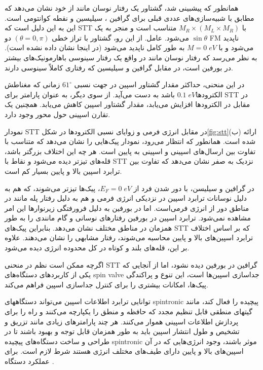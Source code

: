همانطور که پیشبینی شد، گشتاور یک رفتار نوسان مانند از خود نشان ‌می‌دهد که مطابق با شبیه‌سازی‌های عددی قبلی برای گرافین \cite{maherSpindependentTransportSpin2022}، \cite{phamElectronicMagneticProperties2020}سیلیسین \cite{cheraghchiEdgeStatesTheir2012} و نقطه کوانتو‌‌می‌‌ است. این به این دلیل است که \gls{STT} با $M_R \times (M_L \times M_R)$ متناسب است و منجر به یک $\sin\theta$ ‌می‌شود. عامل. از این رو، گشتاور با تراز خطی $(\theta = 0, \pi)$ دو \gls{FM} ناپدید ‌‌می‌‌شود و با $M = 0\; eV$ به طور کامل ناپدید ‌‌می‌‌شود (در اینجا نشان داده نشده است). به نظر ‌‌می‌‌رسد که رفتار نوسان مانند در واقع یک رفتار سینوسی با‌هارمونیک‌های بیشتر در ‌بورفین است، در مقابل گرافین و سیلیسین که رفتاری کاملاً سینوسی دارند. 

در این منحنی، حداکثر مقدار گشتاور اسپین در جهت نسبی $61^\circ$ زمانی که مغناطش الکترودها$0.1\;eV$ باشد به دست ‌‌می‌‌آید. از سوی دیگر، به عنوان پارامتر برای \gls{STT} در مقابل در الکترودها افزایش ‌‌می‌‌یابد، مقدار گشتاور اسپین کاهش ‌‌می‌‌یابد. همچنین یک تقارن اسپینی حول محور وجود دارد. 

نمودار \gls{STT} در مقابل انرژی فر‌‌می‌‌ و زوایای نسبی الکترودها در شکل\ref{fig:stt}(ب) ارائه شده است. همانطور که انتظار ‌‌می‌‌رود، نمودار پیک‌هایی را نشان ‌‌می‌‌دهد که متناسب با تفاوت بین ارسال‌های اسپینی و اسپینی به پایین است. هر چه این اختلاف بزرگتر باشد، قله‌های تیزتر دیده ‌‌می‌‌شود و نقاط با \gls{STT} نزدیک به صفر نشان ‌‌می‌‌دهد که تفاوت بین ترابرد اسپین بالا و پایین بسیار کم است. 

در گرافین و سیلیسن، با دور شدن فرد از $E_F = 0\; eV$، پیک‌ها تیزتر ‌می‌‌شوند، که هم به دلیل نوسانات ترابرد اسپین در نزدیکی انرژی فر‌‌می‌‌ و هم به دلیل رفتار پله مانند در مناطق دور از انرژی فر‌‌می‌‌است. اما در ‌بورفین به دلیل فرورفتگی زیر‌نوارها این امر مشاهده نمی‌‌شود. ترابرد اسپین در ‌بورفین رفتارهای نوسانی و گام مانندی را به طور همزمان در مناطق مختلف نشان ‌‌می‌‌دهد. بنابراین پیک‌های \gls{STT} که بر اساس اختلاف ترابرد اسپین‌های بالا و پایین محاسبه ‌می‌شوند، رفتار مشابهی را نشان ‌می‌دهند. علاوه بر این، قله‌های بلند و کوتاه در کل محدوده انرژی دیده ‌‌می‌‌شود. 

اگرچه ممکن است نظم در منحنی \gls{STT} گرافین در ‌بورفین دیده نشود، اما از آنجایی که یکی از کاربردهای دستگاه‌های \gls{spin valve} جداسازی اسپین‌ها است، این تنوع و پراکندگی پیک‌ها، امکانات بیشتری را برای کنترل جداسازی اسپین فراهم ‌می‌کند. 

توانایی ترابرد اطلاعات اسپین ‌می‌تواند دستگاههای \gls{spintronic} پیچیده را فعال کند، مانند گیتهای منطقی قابل تنظیم مجدد که حافظه و منطق را یکپارچه ‌می‌کنند و راه را برای پردازش اطلاعات اسپینی هموار ‌می‌کنند. هر چند پارامترهای زیادی مانند تزریق و تشخیص و طول انتشار اسپین باید به طور همزمان قابل توجه و بهبود باشند تا در طراحی و ساخت دستگاه‌های پیچیده \gls{spintronic} موثر باشند، وجود انرژی‌هایی که در آن اسپین‌های بالا و پایین دارای طیف‌های مختلف انرژی هستند شرط لازم است. برای عملکرد دستگاه \cite{zhouSpindependentTransportCurrentinduced2016, seneorSpintronicsGraphene2012}. 

